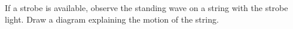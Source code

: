 




If a strobe is available, observe the standing wave on a string with the 
strobe light. Draw a diagram explaining the motion of the string.




